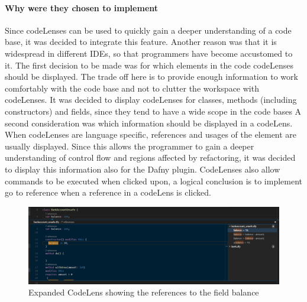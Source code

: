 \paragraph{Why were they chosen to implement}
Since codeLenses can be used to quickly gain a deeper understanding of a code base, it was decided to integrate this feature. Another reason was that it is widespread in different IDEs, so that programmers have become accustomed to it. \newline
The first decision to be made was for which elements in the code codeLenses should be displayed. The trade off here is to  provide enough information to work comfortably with the code base and not to clutter the workspace with codeLenses. It was decided to display codeLenses for classes, methods (including constructors) and fields, since they tend to have a wide scope in the code bases \newline
A second consideration was which information should be displayed in a codeLens. When codeLenses are language specific,  references and usages of the element are usually displayed. Since this allows the programmer to gain a deeper understanding of control flow and regions affected by refactoring, it was decided to display this information also for the Dafny plugin. CodeLenses also allow commands to be executed when clicked upon, a logical conclusion is to implement go to reference when a reference in a codeLens is clicked.\newline
\begin{figure}[H]
	\centering
	\includegraphics[width=1\textwidth]{img/codelensesExpanded}
	\caption{Expanded CodeLens showing the references to the field balance}
	\label{fig:agcodelensesexpanded}
\end{figure}
